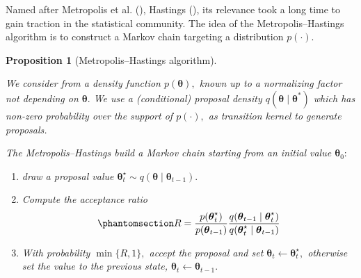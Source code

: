 \documentclass[
  11pt,
  letterpaper,
]{scrbook}
\providecommand{\tightlist}{%
  \setlength{\itemsep}{0pt}\setlength{\parskip}{0pt}}\usepackage{longtable,booktabs,array}
\theoremstyle{definition}
\theoremstyle{plain}
\theoremstyle{plain}
\newtheorem{proposition}{Proposition}[chapter]
\theoremstyle{definition}
\theoremstyle{definition}
\theoremstyle{remark}
\begin{document}
Named after Metropolis et al. (),
Hastings (), its relevance took a long
time to gain traction in the statistical community. The idea of the
Metropolis--Hastings algorithm is to construct a Markov chain targeting
a distribution \(p(\cdot).\)

\begin{proposition}[Metropolis--Hastings
algorithm]\protect\hypertarget{prp-metropolis}{}\label{prp-metropolis}

We consider from a density function \(p(\boldsymbol{\theta}),\) known up
to a normalizing factor not depending on \(\boldsymbol{\theta}.\) We use
a (conditional) proposal density
\(q(\boldsymbol{\theta} \mid \boldsymbol{\theta}^*)\) which has non-zero
probability over the support of \(p(\cdot),\) as transition kernel to
generate proposals.

The Metropolis--Hastings build a Markov chain starting from an initial
value \(\boldsymbol{\theta}_0:\)

\begin{enumerate}
\def\labelenumi{\arabic{enumi}.}
\tightlist
\item
  draw a proposal value
  \(\boldsymbol{\theta}_t^{\star} \sim q(\boldsymbol{\theta} \mid \boldsymbol{\theta}_{t-1}).\)
\item
  Compute the acceptance ratio
  \begin{equation}\phantomsection\label{eq-metropolis-ratio}{
  R = \frac{p(\boldsymbol{\theta}_t^{\star})}{p(\boldsymbol{\theta}_{t-1})}\frac{q(\boldsymbol{\theta}_{t-1} \mid \boldsymbol{\theta}_t^{\star} )}{q(\boldsymbol{\theta}_t^{\star} \mid \boldsymbol{\theta}_{t-1})}
  }\end{equation}
\item
  With probability \(\min\{R, 1\},\) accept the proposal and set
  \(\boldsymbol{\theta}_t \gets \boldsymbol{\theta}_t^{\star},\)
  otherwise set the value to the previous state,
  \(\boldsymbol{\theta}_t \gets \boldsymbol{\theta}_{t-1}.\)
\end{enumerate}

\end{proposition}
\end{document}
